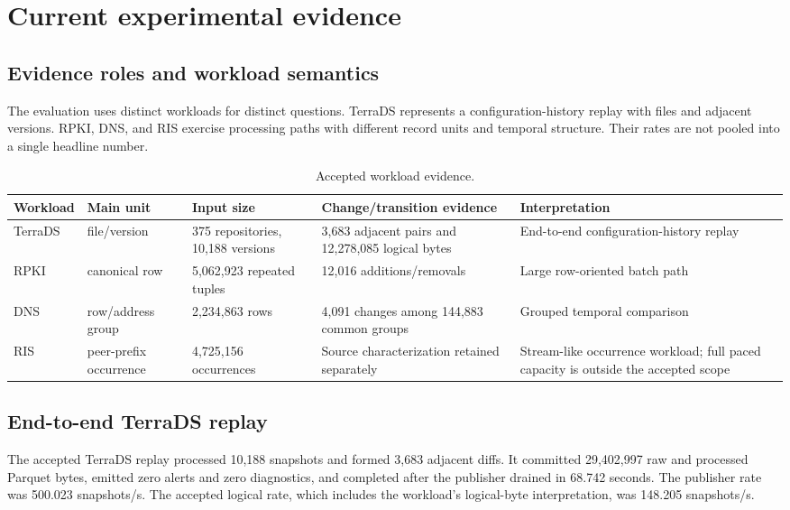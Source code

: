 \documentclass[a4paper,11pt]{article}
\begin{document}
\section{Current experimental evidence}

\subsection{Evidence roles and workload semantics}

The evaluation uses distinct workloads for distinct questions. TerraDS represents a configuration-history replay with files and adjacent versions. RPKI, DNS, and RIS exercise processing paths with different record units and temporal structure. Their rates are not pooled into a single headline number.

\begin{table}[ht]
\centering
\caption{Accepted workload evidence.}
\label{tab:workloads}
\small
\begin{tabularx}{\textwidth}{@{}p{}p{}p{}p{}X@{}}
\toprule
Workload & Main unit & Input size & Change/transition evidence & Interpretation \\
\midrule
TerraDS & file/version & 375 repositories, 10,188 versions & 3,683 adjacent pairs and 12,278,085 logical bytes & End-to-end configuration-history replay \\
RPKI & canonical row & 5,062,923 repeated tuples & 12,016 additions/removals & Large row-oriented batch path \\
DNS & row/address group & 2,234,863 rows & 4,091 changes among 144,883 common groups & Grouped temporal comparison \\
RIS & peer-prefix occurrence & 4,725,156 occurrences & Source characterization retained separately & Stream-like occurrence workload; full paced capacity is outside the accepted scope \\
\bottomrule
\end{tabularx}
\end{table}

\subsection{End-to-end TerraDS replay}

The accepted TerraDS replay processed 10,188 snapshots and formed 3,683 adjacent diffs. It committed 29,402,997 raw and processed Parquet bytes, emitted zero alerts and zero diagnostics, and completed after the publisher drained in 68.742 seconds. The publisher rate was 500.023 snapshots/s. The accepted logical rate, which includes the workload's logical-byte interpretation, was 148.205 snapshots/s.
\end{document}
